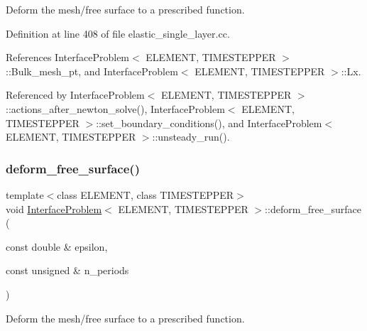 Deform the mesh/free surface to a prescribed function. 



Definition at line 408 of file elastic\+\_\+single\+\_\+layer.\+cc.



References Interface\+Problem$<$ E\+L\+E\+M\+E\+N\+T, T\+I\+M\+E\+S\+T\+E\+P\+P\+E\+R $>$\+::\+Bulk\+\_\+mesh\+\_\+pt, and Interface\+Problem$<$ E\+L\+E\+M\+E\+N\+T, T\+I\+M\+E\+S\+T\+E\+P\+P\+E\+R $>$\+::\+Lx.



Referenced by Interface\+Problem$<$ E\+L\+E\+M\+E\+N\+T, T\+I\+M\+E\+S\+T\+E\+P\+P\+E\+R $>$\+::actions\+\_\+after\+\_\+newton\+\_\+solve(), Interface\+Problem$<$ E\+L\+E\+M\+E\+N\+T, T\+I\+M\+E\+S\+T\+E\+P\+P\+E\+R $>$\+::set\+\_\+boundary\+\_\+conditions(), and Interface\+Problem$<$ E\+L\+E\+M\+E\+N\+T, T\+I\+M\+E\+S\+T\+E\+P\+P\+E\+R $>$\+::unsteady\+\_\+run().

\mbox{\label{classInterfaceProblem_a2319232b08d9df1ab473f6cbd40939d5}} 
\subsubsection{\texorpdfstring{deform\+\_\+free\+\_\+surface()}{deform\_free\_surface()}\hspace{0.1cm}{\footnotesize\ttfamily [2/2]}}
{\footnotesize\ttfamily template$<$class E\+L\+E\+M\+E\+NT, class T\+I\+M\+E\+S\+T\+E\+P\+P\+ER$>$ \\
void \hyperlink{classInterfaceProblem}{Interface\+Problem}$<$ E\+L\+E\+M\+E\+NT, T\+I\+M\+E\+S\+T\+E\+P\+P\+ER $>$\+::deform\+\_\+free\+\_\+surface (\begin{DoxyParamCaption}\item[{const double \&}]{epsilon,  }\item[{const unsigned \&}]{n\+\_\+periods }\end{DoxyParamCaption})\hspace{0.3cm}{\ttfamily [private]}}



Deform the mesh/free surface to a prescribed function. 

\mbox{\label{classInterfaceProblem_a49714e35e94f7d2af0b6ddd22b851f52}} 
